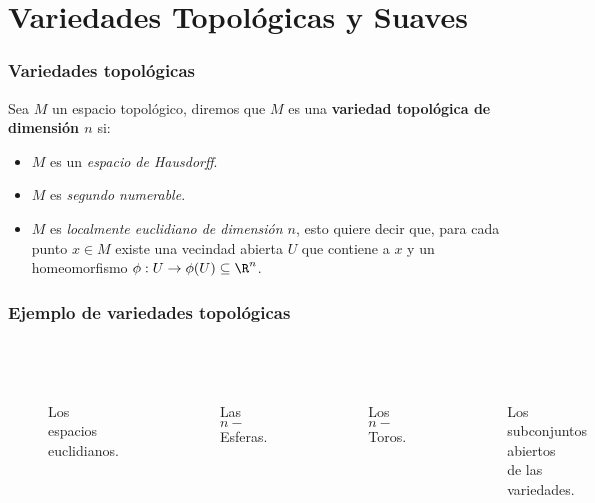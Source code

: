 \section{Variedades Topológicas y Suaves}
\begin{frame}
	\frametitle{Variedades topológicas}
	\begin{definition}
		Sea $M$ un espacio topológico, diremos que $M$ es una \textbf{variedad topológica de dimensión $n$} si:
		\begin{itemize}
			\item $M$ es un \textit{espacio de Hausdorff}.
			\item $M$ es \textit{segundo numerable}.
			\item $M$ es \textit{localmente euclidiano de dimensión $n$}, esto quiere decir que, para cada punto $x \in M$ existe una vecindad abierta $U$ que contiene a $x$ y un homeomorfismo $\phi: U \to \phi(U)\subseteq \R^n$.
		\end{itemize}
	\end{definition}
\end{frame}

% 		

\begin{frame}
	\frametitle{Ejemplo de variedades topológicas}
	\begin{columns}[t]
		\centering
		\begin{figure}
			\scalebox{.5}{}\\
			\caption{Los espacios euclidianos.}
		\end{figure}
		\begin{figure}
			\scalebox{.5}{}\\
			\caption{Las $n-$Esferas.}
		\end{figure}
		\centering
		\begin{figure}
			\vspace{12pt}
			\scalebox{.45}{}\\
			\caption{Los $n-$Toros.}
		\end{figure}
		\begin{figure}
			\vspace{-6pt}
			\centering
			\scalebox{.55}{}\\
			\caption{Los subconjuntos abiertos\\ de las variedades.}
		\end{figure}
	\end{columns}
\end{frame}

